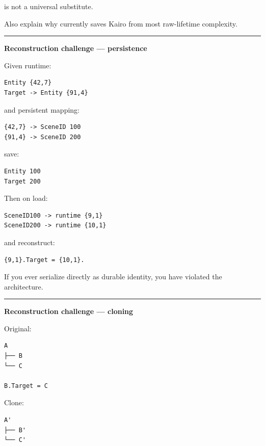 is not a universal substitute.

Also explain why  currently saves Kairo from most raw-lifetime complexity.

\begin{center}\rule{0.5\linewidth}{0.5pt}\end{center}

\textbf{Reconstruction challenge --- persistence}

Given runtime:

\begin{verbatim}
Entity {42,7}
Target -> Entity {91,4}
\end{verbatim}

and persistent mapping:

\begin{verbatim}
{42,7} -> SceneID 100
{91,4} -> SceneID 200
\end{verbatim}

save:

\begin{verbatim}
Entity 100
Target 200
\end{verbatim}

Then on load:

\begin{verbatim}
SceneID100 -> runtime {9,1}
SceneID200 -> runtime {10,1}
\end{verbatim}

and reconstruct:

\begin{verbatim}
{9,1}.Target = {10,1}.
\end{verbatim}

If you ever serialize  directly as durable identity, you have violated the architecture.

\begin{center}\rule{0.5\linewidth}{0.5pt}\end{center}

\textbf{Reconstruction challenge --- cloning}

Original:

\begin{verbatim}
A
├── B
└── C

B.Target = C
\end{verbatim}

Clone:

\begin{verbatim}
A'
├── B'
└── C'
\end{verbatim}

